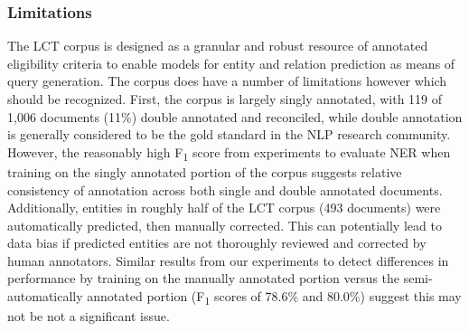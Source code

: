 \documentclass[../main.tex]{subfiles}
\begin{document}
\subsubsection{Limitations}
The LCT corpus is designed as a granular and robust resource of annotated eligibility criteria to enable models for entity and relation prediction as means of query generation. The corpus does have a number of limitations however which should be recognized. First, the corpus is largely singly annotated, with 119 of 1,006 documents (11\%) double annotated and reconciled, while double annotation is generally considered to be the gold standard in the NLP research community. However, the reasonably high F\textsubscript{1} score from experiments to evaluate NER when training on the singly annotated portion of the corpus suggests relative consistency of annotation across both single and double annotated documents. Additionally, entities in roughly half of the LCT corpus (493 documents) were automatically predicted, then manually corrected. This can potentially lead to data bias if predicted entities are not thoroughly reviewed and corrected by human annotators. Similar results from our experiments to detect differences in performance by training on the manually annotated portion versus the semi-automatically annotated portion (F\textsubscript{1} scores of 78.6\% and 80.0\%) suggest this may not be not a significant issue. \\
\end{document}
